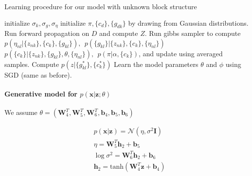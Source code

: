 \begin{algorithm}[t]
\caption{Learning procedure for our model with unknown block structure}\label{alg}
\begin{algorithmic}[1]
\STATE initialize $\sigma_k, \sigma_g, \sigma_{\eta}$
\STATE initialize $\pi, \{c_d\}, \{g_{dk}\}$ by drawing from Gaussian distributions.
\STATE Run forward propagation on $D$ and compute $Z$.
\STATE Run gibbs sampler to compute $p(\eta_{nl}|\{z_{nk}\}, \{c_k\}, \{g_{kl}\}), ~~p(\{g_{kl}\}|\{z_{nk}\},\{c_k\}, \{\eta_{nl}\})$\\
$p(\{c_k\}|\{z_{nk}\},\{g_{kl}\}, \theta, \{\eta_{nl}\}), ~~p(\pi|\alpha,\{c_k\})$, and update using averaged samples.
\STATE Compute $p(z|\{g_{kl}^*\},\{c_k^*\})$
\STATE Learn the model parameters $\theta$ and $\phi$ using SGD (same as before).
\ENDFOR
\ENDFOR
\end{algorithmic}
\label{alg:model}
\end{algorithm}














\iffalse

\paragraph{Generative model for $p(\mathbf{x}|\mathbf{z};\theta)$}  We assume $\theta=(\mathbf{W}_4^T, \mathbf{W}_5^T,\mathbf{W}_6^T, \mathbf{b}_4, \mathbf{b}_5,\mathbf{b}_6)$

\begin{align}
& p(\mathbf{x}|\mathbf{z}) = \mathcal{N}(\eta, \sigma^2\mathbf{I}) \\
& \eta = \mathbf{W}_5^T\mathbf{h}_2 + \mathbf{b}_5 \\
& \log \sigma^2 = \mathbf{W}_6^T\mathbf{h}_2 + \mathbf{b}_6 \\
& \mathbf{h}_2 = \mbox{tanh}(\mathbf{W}_4^T\mathbf{z} + \mathbf{b}_4)
\end{align}



